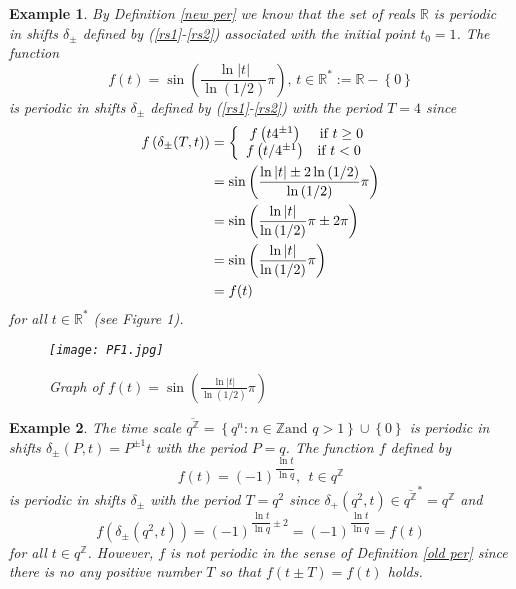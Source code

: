 \documentclass[b5paper,reqno]{amsart}\usepackage{amsfonts}
\theoremstyle{plain}
\newtheorem{example}{Example}
\numberwithin{equation}{section}
\begin{document}
\begin{example}
By Definition \ref{new per} we know that the set of reals $\mathbb{R}$ is
periodic in shifts $\delta_{\pm}$ defined by (\ref{rs1}-\ref{rs2}) associated
with the initial point $t_{0}=1$. The function\[
f(t)=\sin\left(  \frac{\ln\left\vert t\right\vert }{\ln\left(  1/2\right)
}\pi\right)  \text{, }t\in\mathbb{R}^{\ast}:=\mathbb{R}-\left\{  0\right\}
\]
is periodic in shifts $\delta_{\pm}$ defined by (\ref{rs1}-\ref{rs2}) with the
period $T=4$ since\begin{align*}
f\left(  \delta_{\pm}(T,t)\right)   &  =\left\{
\begin{array}
[c]{cc}f\left(  t4^{\pm1}\right)  & \text{if }t\geq0\\
f\left(  t/4^{\pm1}\right)  & \text{if }t<0\text{ }\end{array}
\right. \\
&  =\sin\left(  \frac{\ln\left\vert t\right\vert \pm2\ln\left(  1/2\right)
}{\ln\left(  1/2\right)  }\pi\right) \\
&  =\sin\left(  \frac{\ln\left\vert t\right\vert }{\ln\left(  1/2\right)  }\pi\pm2\pi\right) \\
&  =\sin\left(  \frac{\ln\left\vert t\right\vert }{\ln\left(  1/2\right)  }\pi\right) \\
&  =f(t)
\end{align*}
for all $t\in\mathbb{R}^{\ast}$ (see Figure 1).

\begin{figure}[h]
\texttt{[image: PF1.jpg]}\newline\caption{Graph of $f(t)=\sin
\left(  \frac{\ln\left\vert t\right\vert }{\ln\left(  1/2\right)  }\pi\right)
$}\end{figure}
\end{example}

\begin{example}
The time scale $\overline{q^{\mathbb{Z}}}=\left\{  q^{n}:n\in\mathbb{Z}\text{
and }q>1\right\}  \cup\left\{  0\right\}  $ is periodic in shifts $\delta
_{\pm}(P,t)=P^{\pm1}t$ with the period $P=q$. The function $f$ defined by\begin{equation}
f(t)=\left(  -1\right)  ^{\dfrac{\ln t}{\ln q}},\ \ t\in q^{\mathbb{Z}}
\label{f}\end{equation}
is periodic in shifts $\delta_{\pm}$ with the period $T=q^{2}$ since
$\delta_{+}(q^{2},t)\in\overline{q^{\mathbb{Z}}}^{\ast}=q^{\mathbb{Z}}$ and\[
f\left(  \delta_{\pm}(q^{2},t)\right)  =\left(  -1\right)  ^{\dfrac{\ln t}{\ln
q}\pm2}=\left(  -1\right)  ^{\dfrac{\ln t}{\ln q}}=f(t)
\]
for all $t\in q^{\mathbb{Z}}$. However, $f$ is not periodic in the sense of
Definition \ref{old per} since there is no any positive number $T$ so that
$f(t\pm T)=f(t)$ holds.
\end{example}
\end{document}
